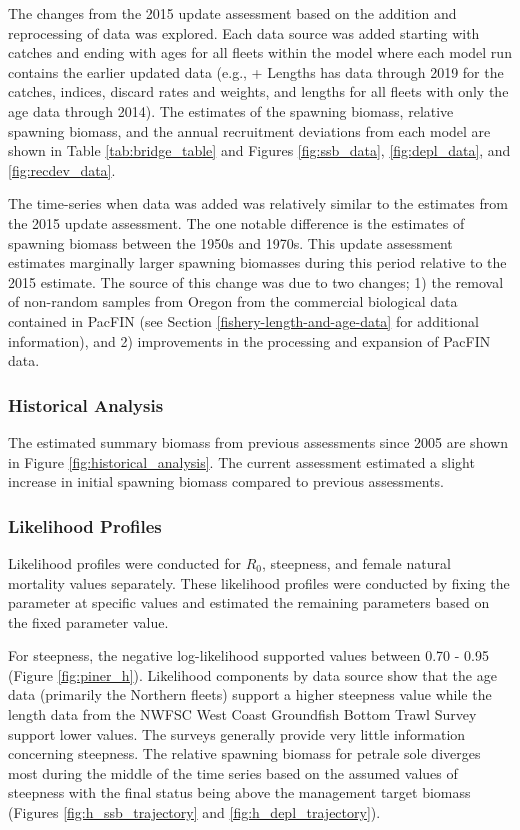 \documentclass[12pt,]{article}
\begin{document}
The changes from the 2015 update assessment based on the addition and
reprocessing of data was explored. Each data source was added starting
with catches and ending with ages for all fleets within the model where
each model run contains the earlier updated data (e.g., + Lengths has
data through 2019 for the catches, indices, discard rates and weights,
and lengths for all fleets with only the age data through 2014). The
estimates of the spawning biomass, relative spawning biomass, and the
annual recruitment deviations from each model are shown in Table
\ref{tab:bridge_table} and Figures \ref{fig:ssb_data},
\ref{fig:depl_data}, and \ref{fig:recdev_data}.

The time-series when data was added was relatively similar to the
estimates from the 2015 update assessment. The one notable difference is
the estimates of spawning biomass between the 1950s and 1970s. This
update assessment estimates marginally larger spawning biomasses during
this period relative to the 2015 estimate. The source of this change was
due to two changes; 1) the removal of non-random samples from Oregon
from the commercial biological data contained in PacFIN (see Section
\ref{fishery-length-and-age-data} for additional information), and 2)
improvements in the processing and expansion of PacFIN data.

\subsubsection{Historical Analysis}\label{historical-analysis}

The estimated summary biomass from previous assessments since 2005 are
shown in Figure \ref{fig:historical_analysis}. The current assessment
estimated a slight increase in initial spawning biomass compared to
previous assessments.

\subsubsection{Likelihood Profiles}\label{likelihood-profiles}

Likelihood profiles were conducted for \(R_0\), steepness, and female
natural mortality values separately. These likelihood profiles were
conducted by fixing the parameter at specific values and estimated the
remaining parameters based on the fixed parameter value.

For steepness, the negative log-likelihood supported values between 0.70
- 0.95 (Figure \ref{fig:piner_h}). Likelihood components by data source
show that the age data (primarily the Northern fleets) support a higher
steepness value while the length data from the NWFSC West Coast
Groundfish Bottom Trawl Survey support lower values. The surveys
generally provide very little information concerning steepness. The
relative spawning biomass for petrale sole diverges most during the
middle of the time series based on the assumed values of steepness with
the final status being above the management target biomass (Figures
\ref{fig:h_ssb_trajectory} and \ref{fig:h_depl_trajectory}).
\end{document}
